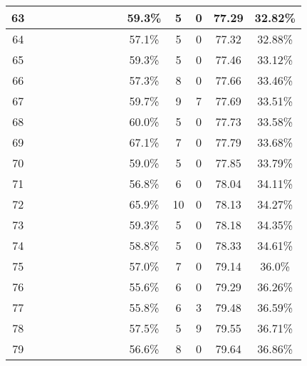 \begin{longtable}{|c|c|c|c|c|c|c|c|c|c|c|c|c|c|}
63 &  \x    & \x    & \x    & \x    & \x    & \x    &       &       & 59.3\% &  5  & 0  & 77.29 & 32.82\% \\ \hline
64 &  \x    & \x    & \x    &       &       & \x\m  & \x    &       & 57.1\% &  5  & 0  & 77.32 & 32.88\% \\ \hline
65 &  \x    & \x    & \x    &       & \x    & \x    &       & \x\m  & 59.3\% &  5  & 0  & 77.46 & 33.12\% \\ \hline
66 &  \x    & \x    & \x    & \x    &       &       &       &       & 57.3\% &  8  & 0  & 77.66 & 33.46\% \\ \hline
67 &  \x    & \x    &       &       & \x    &       &       &       & 59.7\% &  9  & 7  & 77.69 & 33.51\% \\ \hline
68 &  \x    & \x    & \x    &       & \x    & \x\m  & \x\m  &       & 60.0\% &  5  & 0  & 77.73 & 33.58\% \\ \hline
69 &  \x    & \x    &       & \x    & \x\m  &       &       &       & 67.1\% &  7  & 0  & 77.79 & 33.68\% \\ \hline
70 &  \x    & \x    & \x    & \x    & \x    & \x\m  & \x    &       & 59.0\% &  5  & 0  & 77.85 & 33.79\% \\ \hline
71 &  \x    & \x    & \x    & \x    &       & \x    &       &       & 56.8\% &  6  & 0  & 78.04 & 34.11\% \\ \hline
72 &  \x    & \x    &       &       & \x\m  &       & \x\m  &       & 65.9\% &  10 & 0  & 78.13 & 34.27\% \\ \hline
73 &  \x    & \x    & \x    &       & \x    & \x\m  &       & \x    & 59.3\% &  5  & 0  & 78.18 & 34.35\% \\ \hline
74 &  \x    & \x    & \x    & \x    &       & \x\m  & \x\m  &       & 58.8\% &  5  & 0  & 78.33 & 34.61\% \\ \hline
75 &  \x    & \x    & \x    & \x    &       &       &       & \x\m  & 57.0\% &  7  & 0  & 79.14 & 36.0\% \\ \hline
76 &  \x    & \x    & \x    &       &       &       &       &       & 55.6\% &  6  & 0  & 79.29 & 36.26\% \\ \hline
77 &  \x    & \x    & \x    &       &       & \x\m  &       & \x\m  & 55.8\% &  6  & 3  & 79.48 & 36.59\% \\ \hline
78 &  \x    & \x    & \x    & \x    &       & \x\m  &       & \x\m  & 57.5\% &  5  & 9  & 79.55 & 36.71\% \\ \hline
79 &  \x    & \x    & \x    &       &       &       &       & \x\m  & 56.6\% &  8  & 0  & 79.64 & 36.86\% \\ \hline

\end{longtable}
